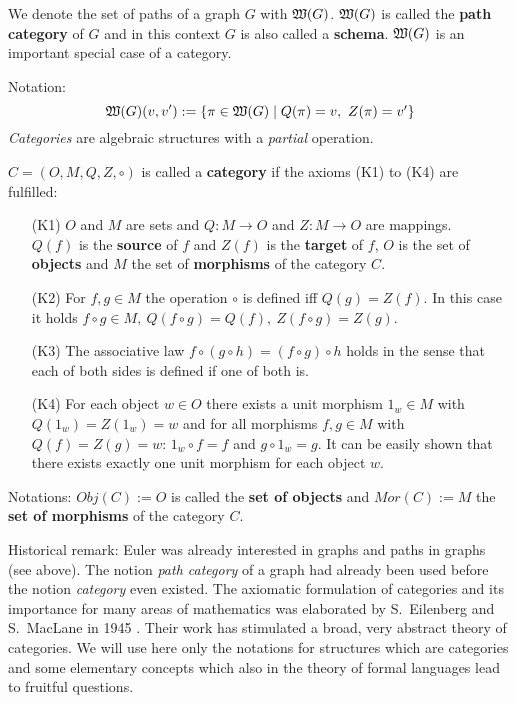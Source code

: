We denote the set of paths of a graph $G$ with $\mbox{$\mathfrak{W}({G})$}$. $\mbox{$\mathfrak{W}({G})$}$ is 
called the {\bf path category} of $G$ and in this context $G$ is also called a {\bf
schema}. $\mbox{$\mathfrak{W}({G})$}$ is an important special case of a category.


Notation: 
\[ \mbox{$\mathfrak{W}({G})$}(v, v') := \mbox{$\{\pi \in \mbox{$\mathfrak{W}({G})$} \mid Q(\pi) = v,\ Z(\pi) =
v'\}$}
\]
{\em Categories} are algebraic structures with a {\em partial} operation.

\begin{definition}
$C = (O, M, Q, Z, \circ)$ is called a {\bf category} if the axioms (K1) to
(K4) are fulfilled:
\begin{enumerate}
  \item[(K1)] $O$ and $M$ are sets and $Q: M \to O$ and $Z: M \to O$ are
  mappings.\\
  $Q(f)$ is the {\bf source} of $f$ and $Z(f)$ is the {\bf target} of $f$, $O$
  is the set of {\bf objects} and $M$ the set of {\bf morphisms} of the category $C$.
  \item[(K2)] For $f, g \in M$ the operation $\circ$ is defined iff $Q(g) =
  Z(f)$. In this case it holds $f \circ g \in M,\ Q(f \circ g) = Q(f),\ Z(f
  \circ g) = Z(g)$.
  \item[(K3)] The associative law $f \circ (g \circ h) = (f \circ g) \circ h$
  holds in the sense that each of both sides is defined if one of both is.
  \item[(K4)] For each object $w \in O$ there exists a unit morphism $1_w \in M$
  with $Q(1_w) = Z(1_w) = w$ and for all morphisms $f, g \in M$ with $Q(f) =
  Z(g) = w$: $1_w \circ f = f$ and $g \circ 1_w = g$. It can be easily shown
  that there exists exactly one unit morphism for each object $w$.
\end{enumerate}
\end{definition}

Notations: $Obj(C) := O$ is called the {\bf set of objects} and $Mor(C) := M$
the {\bf set of morphisms} of the category $C$.

Historical remark: Euler was already interested in graphs and paths in graphs
(see above). The notion {\em path category} of a graph had already been used
before the notion {\em category} even existed. The axiomatic formulation of
categories and its importance for many areas of mathematics was elaborated by
S.\ Eilenberg and S.\ MacLane in 1945 \cite{EiMa}. Their work has stimulated a broad, 
very abstract theory of categories. We will use here only the notations for
structures which are categories and some elementary concepts which also in the theory of formal 
languages lead to fruitful questions.

